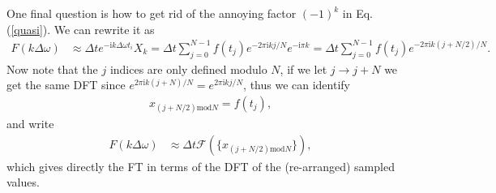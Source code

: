 \documentclass[english,12pt]{shreyasnotes}
\newcommand{\ii}{\mathrm{i}}
\newcommand{\eq}[1]{\begin{align}#1\end{align}}
\begin{document}
One final question is how to get rid of the annoying factor $(-1)^k$ in Eq. (\ref{quasi}). We can rewrite it as
\eq{
F(k \Delta \omega)&\approx \Delta t e^{-\ii k \Delta \omega t_i} X_k=\Delta t \sum_{j=0}^{N-1} f(t_j) e^{-2 \pi \ii k  j/N} e^{-\ii \pi k }=\Delta t \sum_{j=0}^{N-1} f(t_j) e^{-2 \pi \ii k  (j+N/2)/N}.
}
Now note that the $j$ indices are only defined modulo $N$, if we let $j \to j+N$ we get the same DFT since $e^{2 \pi \ii k(j+N)/N}=e^{2 \pi \ii k j /N}$, thus we can identify
\eq{
x_{(j+N/2) \text{mod} N} = f(t_j),
} 
and write
\eq{
F(k \Delta \omega)&\approx \Delta t \mathcal{F}\left(\{x_{(j+N/2) \text{mod} N} \}\right),
}
which gives directly the FT in terms of the DFT of the (re-arranged) sampled values.
\end{document}
